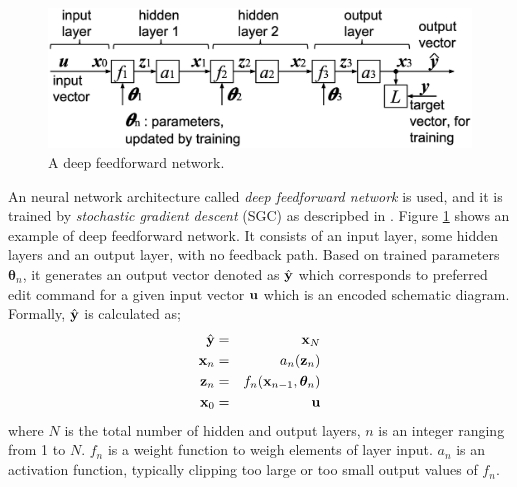 \documentclass[twocolumn]{article}
\begin{document}
\begin{figure}[!tb]
 \begin{center}
  \begin{minipage}{\hsize}
   \includegraphics[width=\hsize]{fig/deep_feedforward_03.eps}
   \caption{A deep feedforward network.}
   \label{fig:deep_feedforward}
  \end{minipage}
 \end{center}
\end{figure}

An neural network architecture called {\it deep feedforward network} is used,
and it is trained by {\it stochastic gradient descent} (SGC)
as descripbed in \cite{mit}.
Figure \ref{fig:deep_feedforward} shows an example of deep feedforward network.
It consists of an input layer, some hidden layers and an output layer,
with no feedback path.
Based on trained parameters ${\bm \theta}_n$,
it generates an output vector denoted as $\hat{\bf y}$
which corresponds to preferred edit command for a given input vector
${\bf u}$ which is an encoded schematic diagram.
Formally, $\hat{\bf y}$ is calculated as;
\begin{eqnarray}
\hat{\bf y} &=& {\bf x}_N \\
{\bf x}_n &=& a_n({\bf z}_n) \\
{\bf z}_n &=& f_n({\bf x}_{n-1}, {\bm \theta}_n)\\
{\bf x}_0 &=& {\bf u}
\end{eqnarray}
where $N$ is the total number of hidden and output layers,
$n$ is an integer ranging from 1 to $N$.
$f_n$ is a weight function to weigh elements of layer input.
$a_n$ is an activation function,
typically clipping too large or too small output values of $f_n$.
\end{document}
